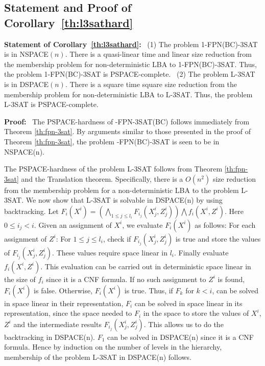 \subsection{Statement and Proof of Corollary~\ref{th:l3sathard}}

\noindent
\textbf{Statement of Corollary~\ref{th:l3sathard}:}~
(1) The problem 1-FPN(BC)-3SAT is in NSPACE$(n)$.
There is a quasi-linear
time and linear size reduction from the membership problem for non-deterministic
LBA to 1-FPN(BC)-3SAT.
Thus, the  problem 1-FPN(BC)-3SAT is PSPACE-complete.~
(2)
The problem L-3SAT is in DSPACE$(n)$.
There is a square time
square size reduction from the membership problem for non-deterministic
LBA to L-3SAT. Thus, the  problem L-3SAT is PSPACE-complete.

\medskip

\noindent
{\bf Proof:}~
The {\sf PSPACE}-hardness of {-FPN-3SAT(BC)} follows 
immediately from Theorem \ref{th:fpn-3sat}.
By arguments similar to those
presented in the proof of Theorem \ref{th:fpn-3sat}, 
the problem {-FPN(BC)-3SAT}  is seen to be in {\sf NSPACE(n)}.

The {\sf PSPACE}-hardness of  the problem {\sf L-3SAT} follows
from Theorem \ref{th:fpn-3sat} and the Translation theorem. Specifically,
there is a $O(n^2)$ size reduction from the membership problem for a  
non-deterministic {\sf LBA} to the problem  {\sf L-3SAT}.
We now show that {\sf L-3SAT} is solvable in {\sf DSPACE(n)}
by using backtracking. 
Let $\displaystyle{F_i(X^i)=(\bigwedge_{1 \leq j \leq  l_i} 
F_{i_j}(X^i_j,Z^i_j)) \bigwedge f_i(X^i,Z^i)}$.
Here $0 \leq i_j <i$.
Given an assignment of $X^i$, 
we evaluate $F_i(X^i)$ as follows:
For each assignment of $Z^i$:
For $1 \leq j \leq  l_i$, 
check if $F_{i_j}(X^i_j,Z^i_j)$ is true and store the values of 
$F_{i_j}(X^i_j,Z^i_j)$.
These values require space linear in $l_i$. Finally evaluate $f_i(X^i,Z^i)$.
This evaluation can be carried out in deterministic space linear in the size of
$f_i$ since it is a {\sf CNF} formula.
If no such assignment to $Z^i$ is found, 
$F_i(X^i)$ is false. Otherwise, $F_i(X^i)$ is true.
Thus, if $F_k$ for $k < i$, can be solved in space linear in their
representation, $F_i$ can be solved in space linear in its representation,
since the space needed to $F_i$ in the space to store the values of
$X^i$, $Z^i$ and the intermediate results $F_{i_j}(X^i_j,Z^i_j)$. This
allows us to do the backtracking in {\sf DSPACE(n)}.
$F_1$ can be solved in {\sf DSPACE(n)}  since it is a {\sf CNF} formula.
Hence by induction on the number of levels in the hierarchy, membership of
the problem {\sf L-3SAT} in {\sf DSPACE(n)} follows. \hfill\QED

